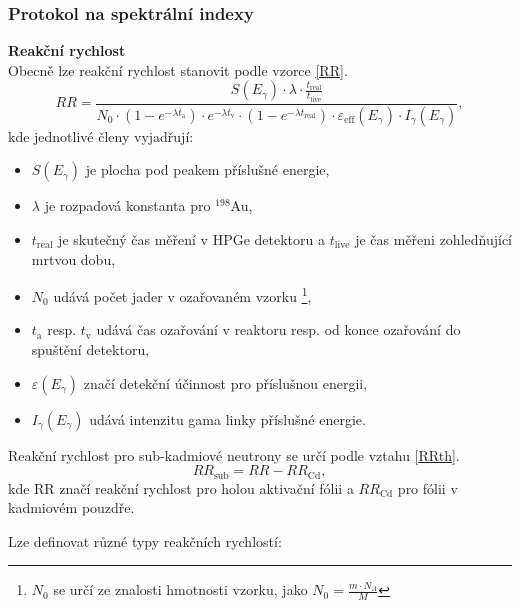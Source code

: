 \subsubsection{Protokol na spektrální indexy}
\textbf{Reakční rychlost}\\
Obecně lze reakční rychlost stanovit podle vzorce \ref{RR}.
\begin{equation} \label{RR}
   RR = \frac{S(E_{\gamma})\cdot \lambda \cdot \frac{t_{\text{real}}}{t_{\text{live}}}}{N_0 \cdot (1-e^{-\lambda t_{\text{a}}}) \cdot e^{-\lambda t_{\text{v}}} \cdot (1-e^{-\lambda t_{\text{real}}}) \cdot \varepsilon_\text{eff}(E_{\gamma}) \cdot I_{\gamma}(E_{\gamma})},
\end{equation}
kde jednotlivé členy vyjadřují:
\begin{itemize}
    \item  $S(E_{\gamma})$ je plocha pod peakem příslušné energie,
    \item  $\lambda$ je rozpadová konstanta pro $^{198}$Au,
    \item  $t_\text{real}$ je skutečný  čas měření v HPGe detektoru a $t_\text{live}$ je čas měřeni zohledňující mrtvou dobu, 
    \item  $N_0$ udává počet jader v ozařovaném vzorku \footnote{$N_0$ se určí ze znalosti hmotnosti vzorku, jako $N_0 = \frac{m \cdot N_A}{M}$},
    \item  $t_\text{a}$ resp. $t_\text{v}$ udává čas ozařování v reaktoru resp. od konce ozařování do spuštění detektoru,
    \item  $\varepsilon(E_{\gamma})$ značí detekční účinnost pro příslušnou energii,
    \item  $I_{\gamma}(E_{\gamma})$ udává intenzitu gama linky příslušné energie.
\end{itemize}

Reakční rychlost pro sub-kadmiové neutrony se určí podle vztahu \eqref{RRth}.
\begin{equation} \label{RRth}
    RR_\text{sub} = RR - RR_\text{Cd},
\end{equation}
kde RR značí reakční rychlost pro holou aktivační fólii a $RR_\text{Cd}$ pro fólii v kadmiovém pouzdře.


Lze definovat různé typy reakčních rychlostí:

